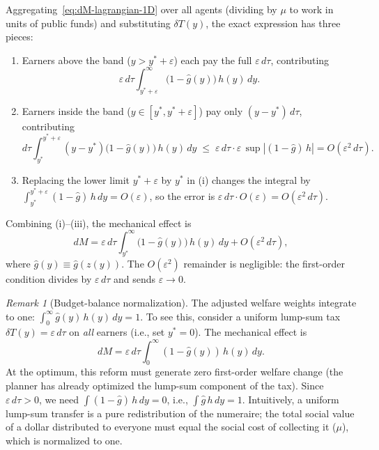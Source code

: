 \documentclass[12pt,a4paper]{article}
\theoremstyle{definition}
\theoremstyle{plain}
\theoremstyle{remark}
\newtheorem{remark}{Remark}[section]
\begin{document}
Aggregating~\eqref{eq:dM-lagrangian-1D} over all agents
(dividing by $\mu$ to work in units of public funds) and
substituting $\delta T(y)$, the exact expression has three
pieces:
\begin{enumerate}[label=(\roman*)]
  \item Earners above the band ($y > y^*+\varepsilon$) each pay
    the full $\varepsilon\,d\tau$, contributing
    \[
      \varepsilon\,d\tau
      \int_{y^*+\varepsilon}^{\infty}
      \bigl(1-\hat g(y)\bigr)\,h(y)\,dy.
    \]
  \item Earners inside the band ($y\in[y^*,y^*+\varepsilon]$) pay
    only $(y-y^*)\,d\tau$, contributing
    \[
      d\tau\int_{y^*}^{y^*+\varepsilon}
      (y-y^*)\bigl(1-\hat g(y)\bigr)\,h(y)\,dy
      \;\le\;
      \varepsilon\,d\tau\cdot\varepsilon\,
      \sup|{(1-\hat g)\,h}|
      = O(\varepsilon^2\,d\tau).
    \]
  \item Replacing the lower limit $y^*+\varepsilon$ by $y^*$ in
    (i) changes the integral by
    $\int_{y^*}^{y^*+\varepsilon}(1-\hat g)\,h\,dy = O(\varepsilon)$,
    so the error is $\varepsilon\,d\tau\cdot O(\varepsilon)
    = O(\varepsilon^2\,d\tau)$.
\end{enumerate}
Combining (i)--(iii), the mechanical effect is
\begin{equation}
\label{eq:dM-pert}
  dM = \varepsilon\,d\tau
  \int_{y^*}^{\infty}
  \bigl(1-\hat g(y)\bigr)\,h(y)\,dy
  + O(\varepsilon^2\,d\tau),
\end{equation}
where $\hat g(y) \equiv \hat g(z(y))$.
The $O(\varepsilon^2)$ remainder is negligible: the first-order
condition divides by $\varepsilon\,d\tau$ and sends
$\varepsilon\to 0$.

\begin{remark}[Budget-balance normalization]
\label{rem:budget_balance}
The adjusted welfare weights integrate to one: $\int_0^\infty \hat g(y)\,h(y)\,dy = 1$. To see this, consider a uniform lump-sum tax $\delta T(y) = \varepsilon\,d\tau$ on \emph{all} earners (i.e., set $y^* = 0$). The mechanical effect is
\[
  dM = \varepsilon\,d\tau \int_{0}^{\infty} (1 - \hat g(y))\,h(y)\,dy.
\]
At the optimum, this reform must generate zero first-order welfare change (the planner has already optimized the lump-sum component of the tax). Since $\varepsilon\,d\tau > 0$, we need $\int (1 - \hat g)\,h\,dy = 0$, i.e., $\int \hat g\,h\,dy = 1$. Intuitively, a uniform lump-sum transfer is a pure redistribution of the numeraire; the total social value of a dollar distributed to everyone must equal the social cost of collecting it ($\mu$), which is normalized to one.
\end{remark}
\end{document}
